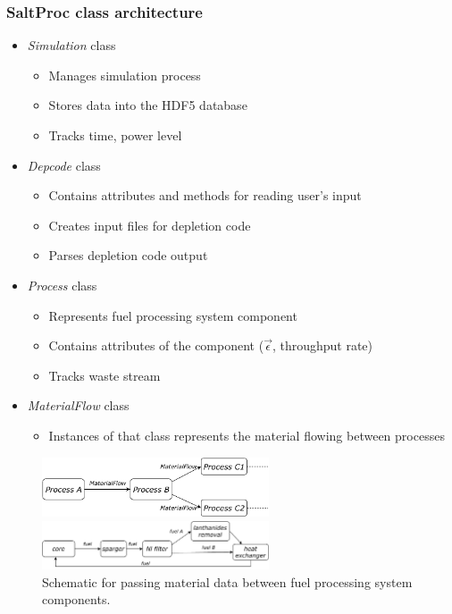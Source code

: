 \begin{frame}
\frametitle{SaltProc class architecture}
	\begin{itemize}
		\item \textit{Simulation} class
			\begin{itemize}
				\item Manages simulation process
				\item Stores data into the HDF5 database
				\item Tracks time, power level
			\end{itemize}
		\item \textit{Depcode} class
			\begin{itemize}
				\item Contains attributes and methods for reading user's input
				\item Creates input files for depletion code
				\item Parses depletion code output 
			\end{itemize}
		\item \textit{Process} class
			\begin{itemize}
				\item Represents fuel processing system component
				\item Contains attributes of the component ($\vec{\epsilon}$, 
				throughput rate)
				\item Tracks waste stream
			\end{itemize}
		\item \textit{MaterialFlow} class
			\begin{itemize}
				\item Instances of that class represents the material flowing between processes
			\end{itemize}
	\end{itemize}
		\vspace{1mm}
	\begin{figure}[ht!] %
		\centering
		\begin{overprint}
		\centerline{\includegraphics[width=0.6\textwidth]{../dissertation/figures/ch2/materialflow.pdf}}
		\centerline{\includegraphics[width=0.6\textwidth]{../dissertation/figures/ch2/tap_materialflow.pdf}}
		\end{overprint}
		\vspace{-2mm}
		\caption{Schematic for passing material data between fuel processing 
		system components.}
	\end{figure}

\end{frame}


